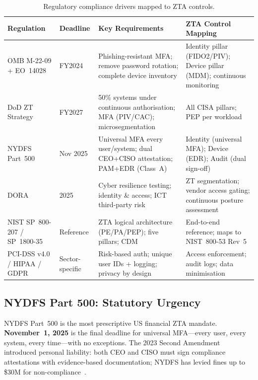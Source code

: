 \documentclass[sigconf,nonacm]{acmart}
\begin{document}
\begin{table}[t]
\caption{Regulatory compliance drivers mapped to ZTA controls.}
\label{tab:compliance}
\small
\setlength{\tabcolsep}{5pt}
\begin{tabularx}{\textwidth}{@{}
  p{3.0cm}   %
  p{1.6cm}   %
  p{5.5cm}   %
  X          %
@{}}
\toprule
\textbf{Regulation} & \textbf{Deadline} &
\textbf{Key Requirements} & \textbf{ZTA Control Mapping} \\
\midrule
OMB M-22-09 + EO~14028~\cite{omb2022} & FY2024
  & Phishing-resistant MFA; remove password rotation; complete device inventory
  & Identity pillar (FIDO2/PIV); Device pillar (MDM); continuous monitoring \\
\addlinespace[3pt]
DoD ZT Strategy~\cite{dod2022} & FY2027
  & 50\% systems under continuous authorisation; MFA (PIV/CAC); microsegmentation
  & All CISA pillars; PEP per workload \\
\addlinespace[3pt]
NYDFS Part~500~\cite{nydfs2025} & Nov 2025
  & Universal MFA every user/system; dual CEO+CISO attestation; PAM+EDR (Class~A)
  & Identity (universal MFA); Device (EDR); Audit (dual sign-off) \\
\addlinespace[3pt]
DORA & 2025
  & Cyber resilience testing; identity \& access; ICT third-party risk
  & ZT segmentation; vendor access gating; continuous posture assessment \\
\addlinespace[3pt]
NIST SP~800-207 / SP~1800-35~\cite{nist800207} & Reference
  & ZTA logical architecture (PE/PA/PEP); five pillars; CDM
  & End-to-end reference; maps to NIST~800-53 Rev~5 \\
\addlinespace[3pt]
PCI-DSS v4.0 / HIPAA / GDPR & Sector-specific
  & Risk-based auth; unique user IDs + logging; privacy by design
  & Access enforcement; audit logs; data minimisation \\
\bottomrule
\end{tabularx}
\end{table}

\subsection{NYDFS Part 500: Statutory Urgency}

NYDFS Part~500 is the most prescriptive US financial ZTA mandate.
\textbf{November~1, 2025} is the final deadline for universal
MFA---every user, every system, every time---with no exceptions.  The
2023 Second Amendment introduced personal liability: both CEO and CISO
must sign compliance attestations with evidence-based documentation;
NYDFS has levied fines up to \$30M for non-compliance~\cite{nydfs2025}.
\end{document}
